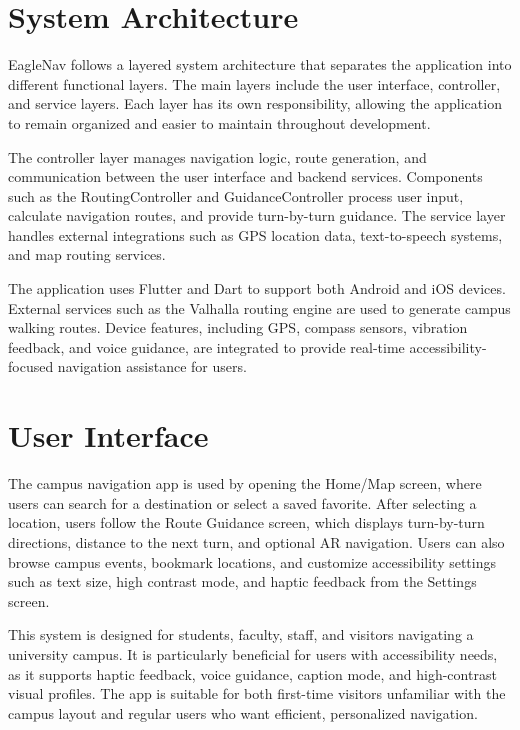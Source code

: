 \documentclass[12pt]{article}
\begin{document}
\section{System Architecture}

EagleNav follows a layered system architecture that separates the application into different functional layers. The main layers include the user interface, controller, and service layers. Each layer has its own responsibility, allowing the application to remain organized and easier to maintain throughout development.

The controller layer manages navigation logic, route generation, and communication between the user interface and backend services. Components such as the RoutingController and GuidanceController process user input, calculate navigation routes, and provide turn-by-turn guidance. The service layer handles external integrations such as GPS location data, text-to-speech systems, and map routing services.

The application uses Flutter and Dart to support both Android and iOS devices. External services such as the Valhalla routing engine are used to generate campus walking routes. Device features, including GPS, compass sensors, vibration feedback, and voice guidance, are integrated to provide real-time accessibility-focused navigation assistance for users.

\section{User Interface}

The campus navigation app is used by opening the Home/Map screen, where users can search for a destination or select a saved favorite. After selecting a location, users follow the Route Guidance screen, which displays turn-by-turn directions, distance to the next turn, and optional AR navigation. Users can also browse campus events, bookmark locations, and customize accessibility settings such as text size, high contrast mode, and haptic feedback from the Settings screen.

This system is designed for students, faculty, staff, and visitors navigating a university campus. It is particularly beneficial for users with accessibility needs, as it supports haptic feedback, voice guidance, caption mode, and high-contrast visual profiles. The app is suitable for both first-time visitors unfamiliar with the campus layout and regular users who want efficient, personalized navigation.
\end{document}
